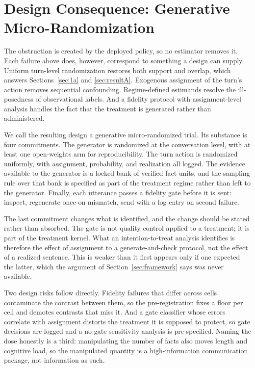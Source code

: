 \documentclass[11pt]{article}
\theoremstyle{definition}
\theoremstyle{remark}
\begin{document}
\section{Design Consequence: Generative Micro-Randomization}\label{sec:gmrt}

The obstruction is created by the deployed policy, so no estimator removes
it. Each failure above does, however, correspond to something a design can
supply. Uniform turn-level randomization restores both support and overlap,
which answers Sections~\ref{sec:1a} and \ref{sec:resultA}. Exogenous
assignment of the turn's action removes sequential confounding.
Regime-defined estimands resolve the ill-posedness of observational labels.
And a fidelity protocol with assignment-level analysis handles the fact that
the treatment is generated rather than administered.

We call the resulting design a generative micro-randomized trial. Its
substance is four commitments. The generator is randomized at the
conversation level, with at least one open-weights arm for reproducibility.
The turn action is randomized uniformly, with assignment, probability, and
realization all logged. The evidence available to the generator is a locked
bank of verified fact units, and the sampling rule over that bank is
specified as part of the treatment regime rather than left to the
generator. Finally, each utterance passes a fidelity gate before it is sent:
inspect, regenerate once on mismatch, send with a log entry on second
failure.

The last commitment changes what is identified, and the change should be
stated rather than absorbed. The gate is not quality control applied to a
treatment; it is part of the treatment kernel. What an intention-to-treat
analysis identifies is therefore the effect of assignment to a
generate-and-check protocol, not the effect of a realized sentence. This is
weaker than it first appears only if one expected the latter, which the
argument of Section~\ref{sec:framework} says was never available.

Two design risks follow directly. Fidelity failures that differ across cells
contaminate the contrast between them, so the pre-registration fixes a floor
per cell and demotes contrasts that miss it. And a gate classifier whose
errors correlate with assignment distorts the treatment it is supposed to
protect, so gate decisions are logged and a no-gate sensitivity analysis is
pre-specified. Naming the dose honestly is a third: manipulating the number
of facts also moves length and cognitive load, so the manipulated quantity is
a high-information communication package, not information as such.
\end{document}
